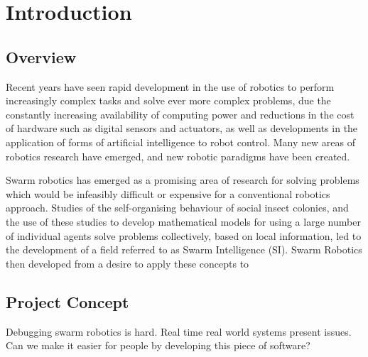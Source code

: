 
\chapter[Introduction]{Introduction} %

\label{Chapter1} %


\newcommand{\keyword}[1]{\textbf{#1}}
\newcommand{\tabhead}[1]{\textbf{#1}}
\newcommand{\code}[1]{\texttt{#1}}
\newcommand{\file}[1]{\texttt{\bfseries#1}}
\newcommand{\option}[1]{\texttt{\itshape#1}}


\section{Overview}
Recent years have seen rapid development in the use of robotics to perform increasingly complex tasks and solve ever more complex problems, due the constantly increasing availability of computing power and reductions in the cost of hardware such as digital sensors and actuators, as well as developments in the application of forms of artificial intelligence to robot control. Many new areas of robotics research have emerged, and new robotic paradigms have been created.

Swarm robotics has emerged as a promising area of research for solving problems which would be infeasibly difficult or expensive for a conventional robotics approach. Studies of the self-organising behaviour of social insect colonies, and the use of these studies to develop mathematical models for using a large number of individual agents solve problems collectively, based on local information, led to the development of a field referred to as Swarm Intelligence (SI). Swarm Robotics then developed from a desire to apply these concepts to 


\section{Project Concept}
Debugging swarm robotics is hard. Real time real world systems present issues. Can we make it easier for people by developing this piece of software?
